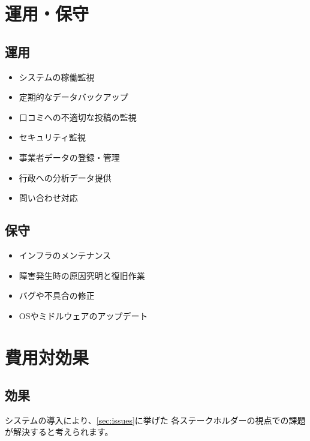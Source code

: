 \documentclass{docs}
\begin{document}
\section{運用・保守}
\subsection{運用}
\begin{itemize}
	\item システムの稼働監視
	\item 定期的なデータバックアップ
	\item 口コミへの不適切な投稿の監視
	\item セキュリティ監視
	\item 事業者データの登録・管理
	\item 行政への分析データ提供
	\item 問い合わせ対応
\end{itemize}

\subsection{保守}
\begin{itemize}
	\item インフラのメンテナンス
	\item 障害発生時の原因究明と復旧作業
	\item バグや不具合の修正
	\item OSやミドルウェアのアップデート
\end{itemize}

\section{費用対効果}
\subsection{効果}
システムの導入により、\cref{sec:issues}に挙げた
各ステークホルダーの視点での課題が解決すると考えられます。
\end{document}
